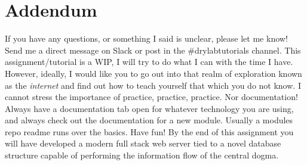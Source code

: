 \section{Addendum}

If you have any questions, or something I said is unclear, please let me know!
Send me a direct message on Slack or post in the \#drylabtutorials channel.
This assignment/tutorial is a WIP, I will try to do what I can with the time I 
have. However, ideally, I would like you to go out into that realm of exploration
known as the \textit{internet} and find out how to teach yourself that which
you do not know. I cannot stress the importance of practice, practice, practice.
Nor documentation! Always have a documentation tab open for whatever technology
you are using, and always check out the documentation for a new module. Usually
a modules repo readme runs over the basics. Have fun! By the end of this 
assignment you will have developed a modern full stack web server tied to
a novel database structure capable of performing the information flow of the
central dogma.


